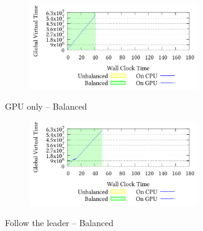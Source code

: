 \documentclass[]{article}
\begin{document}
\setcounter{figure}{1}
\renewcommand{\thefigure}{\arabic{figure}d}
\begin{figure}[!h]
\centering
\begin{subfigure}[b]{\mysize}
\centering
\includegraphics[width=0.8\textwidth]{figures_original/balanced/2.processed.pdf}
\renewcommand{\thesubfigure}{Original}
\caption{}
\end{subfigure}
\begin{subfigure}[b]{\mysize}
\centering
{}
\renewcommand{\thesubfigure}{Reproduced}
\caption{}
\end{subfigure}
\caption{GPU only – Balanced}
\end{figure}



\setcounter{figure}{1}
\renewcommand{\thefigure}{\arabic{figure}g}
\begin{figure}[!h]
\centering
\begin{subfigure}[b]{\mysize}
\centering
\includegraphics[width=0.8\textwidth]{figures_original/balanced/3.processed.pdf}
\renewcommand{\thesubfigure}{Original}
\caption{}
\end{subfigure}
\begin{subfigure}[b]{\mysize}
\centering
{}
\renewcommand{\thesubfigure}{Reproduced}
\caption{}
\end{subfigure}
\caption{Follow the leader – Balanced}
\end{figure}
\end{document}
